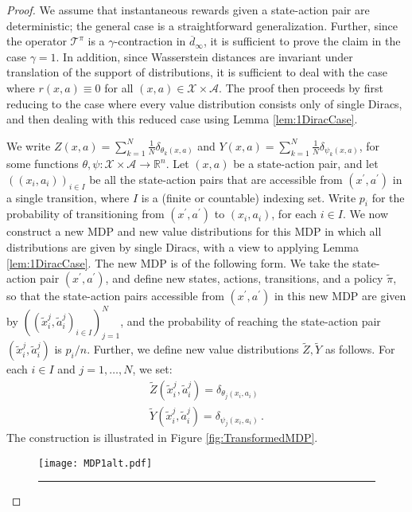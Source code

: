 \documentclass[letterpaper]{article}
\begin{document}
\Winftycontract*

\begin{proof}
We assume that instantaneous rewards given a state-action pair are deterministic; the general case is a straightforward generalization. Further, since the operator $\mathcal{T}^\pi$ is a $\gamma$-contraction in $\overline{d}_\infty$, it is sufficient to prove the claim in the case $\gamma = 1$. In addition, since Wasserstein distances are invariant under translation of the support of distributions, it is sufficient to deal with the case where $r(x, a) \equiv 0$ for all $(x, a) \in \mathcal{X} \times \mathcal{A}$. The proof then proceeds by first reducing to the case where every value distribution consists only of single Diracs, and then dealing with this reduced case using Lemma \ref{lem:1DiracCase}.

We write $Z(x, a) = \sum_{k=1}^N \frac{1}{N} \delta_{\theta_k(x, a)}$ and $Y(x, a) = \sum_{k=1}^N \frac{1}{N} \delta_{\psi_k(x, a)}$, for some functions $\theta, \psi : \mathcal{X} \times \mathcal{A} \rightarrow \mathbb{R}^n$. Let $(x ,a)$ be a state-action pair, and let $((x_i, a_i))_{i \in I}$ be all the state-action pairs that are accessible from $(x^\prime, a^\prime)$ in a single transition, where $I$ is a (finite or countable) indexing set. Write $p_i$ for the probability of transitioning from $(x^\prime, a^\prime)$ to $(x_i, a_i)$, for each $i \in I$. We now construct a new MDP and new value distributions for this MDP in which all distributions are given by single Diracs, with a view to applying Lemma \ref{lem:1DiracCase}. The new MDP is of the following form. We take the state-action pair $(x^\prime, a^\prime)$, and define new states, actions, transitions, and a policy $\widetilde{\pi}$, so that the state-action pairs accessible from $(x^\prime, a^\prime)$ in this new MDP are given by $((\widetilde{x}_i^j, \widetilde{a}_i^j)_{i\in I})_{j=1}^N$, and the probability of reaching the state-action pair $(\widetilde{x}_i^j, \widetilde{a}_i^j)$ is $p_i/n$. Further, we define new value distributions $\widetilde{Z}, \widetilde{Y}$ as follows. For each $i \in I$ and $j=1,\ldots,N$, we set:
\begin{align*}
\widetilde{Z}(\widetilde{x}_i^j, \widetilde{a}_i^j) = \delta_{\theta_j(x_i, a_i)} \\
\widetilde{Y}(\widetilde{x}_i^j, \widetilde{a}_i^j) = \delta_{\psi_j(x_i, a_i)} \, .
\end{align*}
The construction is illustrated in Figure \ref{fig:TransformedMDP}.
\begin{figure}
    \centering
    \texttt{[image: MDP1alt.pdf]}
    \vspace{0.25cm}
    \rule{0.47\textwidth}{0.4pt}



\end{figure}
\end{proof}
\end{document}
